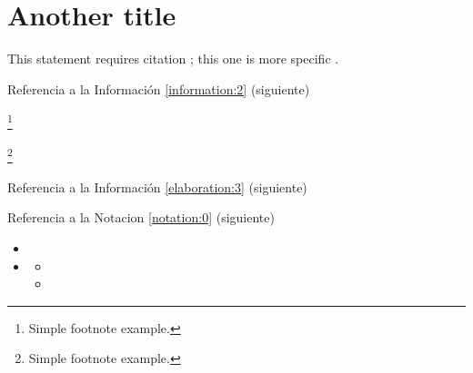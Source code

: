 \lipsum[1][1-3] 

\begin{citationbox}
\lipsum[1][1-3] 
\end{citationbox}

\lipsum[1][1-3] 

\section{Another title}

This statement requires citation \cite{book_key}; this one is more specific \cite[122]{article_key}.
\lipsum[1][1-4]
 
Referencia a la Información \ref{information:2} (siguiente)

\begin{informationbox}[Título B]
\label{information:2}
\lipsum[1][1-3]\footnote{Simple footnote example.}
\end{informationbox}

\lipsum[1] %

\begin{attentionbox}
\label{attentionbox:a}
\lipsum[1][1-3]\footnote{Simple footnote example.}
\end{attentionbox}

\lipsum[1] %

Referencia a la Información \ref{elaboration:3} (siguiente)

\begin{elaboration}[Título C]
\label{elaboration:3}
\lipsum[1][1-3] 
\end{elaboration}

\lipsum[1][1-3] %


Referencia a la Notacion \ref{notation:0} (siguiente)

\begin{notation}[Título C]
\label{notation:0}
\lipsum[1][1-2]
\begin{itemize}
\item \lipsum[1][1-2]
\item \lipsum[1][1-2]
\begin{itemize}
\item \lipsum[1][1-2]
\item \lipsum[1][1-2]
\end{itemize}
\end{itemize}
\end{notation}

\lipsum[1][1-3] %

